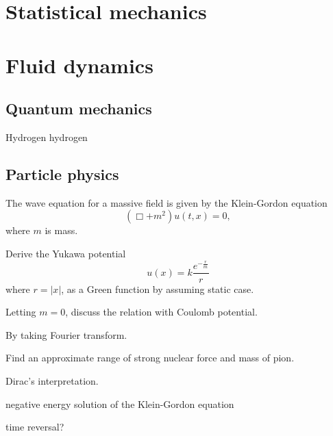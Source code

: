 \documentclass{../prb}
\begin{document}
\chapter{Statistical mechanics}

\chapter{Fluid dynamics}



\section{Quantum mechanics}
\begin{prb}
Hydrogen
\q hydrogen
\end{prb}


\section{Particle physics}
\begin{prb}
The wave equation for a massive field is given by the Klein-Gordon equation
\[(\Box+m^2)u(t,x)=0,\]
where $m$ is mass.
\begin{cond}
\item Derive the Yukawa potential\[u(x)=k\frac{e^{-\frac rm}}r\]where $r=|x|$, as a Green function by assuming static case.
\item Letting $m=0$, discuss the relation with Coulomb potential.
\item By taking Fourier transform.
\item Find an approximate range of strong nuclear force and mass of pion.
\end{cond}
\end{prb}

\begin{prb}
Dirac's interpretation.
\item negative energy solution of the Klein-Gordon equation
\item time reversal?
\end{prb}

\begin{prb}
\end{prb}

\begin{prb}
\end{prb}
\end{document}
